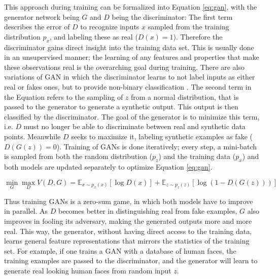 This approach during training can be formalized into Equation \ref{eq:gan}, with the generator network being $G$ and $D$ being the discriminator: The first term describes the error of $D$ to recognize inputs $x$ sampled from the training distribution $p_x$, and labeling these as real ($D(x)=1$). Therefore the discriminator gains direct insight into the training data set. This is usually done in an unsupervised manner; the learning of any features and properties that make these observations real is the overarching goal during training. There are also variations of GAN in which the discriminator learns to not label inputs as either real or fakes ones, but to provide non-binary classification \cite{simonyan2014two, isola2016image}. The second term in the Equation refers to the sampling of $z$ from a normal distribution, that is passed to the generator to generate a synthetic output. This output is then classified by the discriminator. The goal of the generator is to minimize this term, i.e. $D$ must no longer be able to discriminate between real and synthetic data points. Meanwhile $D$ seeks to maximize it, labeling synthetic examples as fake ($D(G(z))=0$). Training of GANs is done iteratively; every step, a mini-batch is sampled from both the random distribution ($p_z$) and the training data ($p_x$) and both models are updated separately to optimize Equation \ref{eq:gan}.

\begin{equation} \label{eq:gan}
\min_G \max_D V(D,G) = \mathbb{E}_{x \sim p_x(x)}[\log D(x)] + \mathbb{E}_{z \sim p_z(z)}[\log(1 - D(G(z)))]
\end{equation}

Thus training GANs is a zero-sum game, in which both models have to improve in parallel. As $D$ becomes better in distinguishing real from fake examples, $G$ also improves in fooling its adversary, making the generated outputs more and more real. This way, the generator, without having direct access to the training data, learns general feature representations that mirrors the statistics of the training set. For example, if one trains a GAN with a database of human faces, the training examples are passed to the discriminator, and the generator will learn to generate real looking human faces from random input $z$. 

